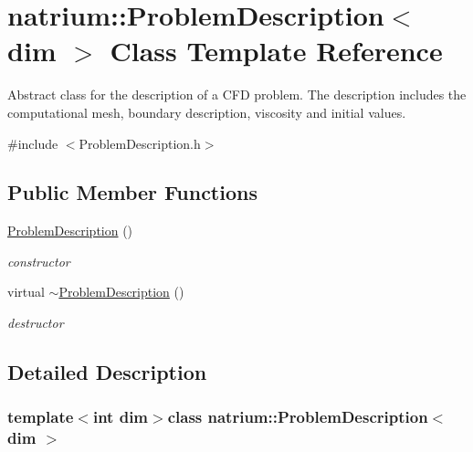 \hypertarget{classnatrium_1_1ProblemDescription}{\section{natrium\-:\-:\-Problem\-Description$<$ dim $>$ \-Class \-Template \-Reference}
\label{classnatrium_1_1ProblemDescription}
}


\-Abstract class for the description of a \-C\-F\-D problem. \-The description includes the computational mesh, boundary description, viscosity and initial values.  




{\ttfamily \#include $<$\-Problem\-Description.\-h$>$}

\subsection*{\-Public \-Member \-Functions}
\begin{DoxyCompactItemize}
\item 
\hypertarget{classnatrium_1_1ProblemDescription_aa82a57ea450c667c7e391a175a54791c}{\hyperlink{classnatrium_1_1ProblemDescription_aa82a57ea450c667c7e391a175a54791c}{\-Problem\-Description} ()}\label{classnatrium_1_1ProblemDescription_aa82a57ea450c667c7e391a175a54791c}

\begin{DoxyCompactList}\small\item\em constructor \end{DoxyCompactList}\item 
\hypertarget{classnatrium_1_1ProblemDescription_a5270994970ddbd9f6fc98f292c1ccc0e}{virtual \hyperlink{classnatrium_1_1ProblemDescription_a5270994970ddbd9f6fc98f292c1ccc0e}{$\sim$\-Problem\-Description} ()}\label{classnatrium_1_1ProblemDescription_a5270994970ddbd9f6fc98f292c1ccc0e}

\begin{DoxyCompactList}\small\item\em destructor \end{DoxyCompactList}\end{DoxyCompactItemize}


\subsection{\-Detailed \-Description}
\subsubsection*{template$<$int dim$>$class natrium\-::\-Problem\-Description$<$ dim $>$}

